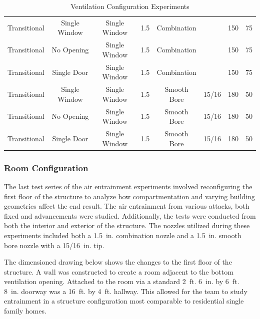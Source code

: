 \documentclass{article}
\begin{document}
\begin{table}[!ht]
{\begin{tabular}{|lccccccc|}
Transitional & Single Window & Single Window & 1.5 & Combination &  & 150 & 75 \\
Transitional & No Opening & Single Window & 1.5 & Combination &  & 150 & 75 \\
Transitional & Single Door & Single Window & 1.5 & Combination &  & 150 & 75 \\
Transitional & Single Window & Single Window & 1.5 & Smooth Bore & 15/16 & 180 & 50 \\
Transitional & No Opening & Single Window & 1.5 & Smooth Bore & 15/16 & 180 & 50 \\
Transitional & Single Door & Single Window & 1.5 & Smooth Bore & 15/16 & 180 & 50 \\ \hline
\end{tabular}}
\caption{Ventilation Configuration Experiments}
\label{Ventilation_Configuration_Experiments}
\end{table}

\clearpage

\subsubsection{Room Configuration}

The last test series of the air entrainment experiments involved reconfiguring the first floor of the structure to analyze how compartmentation and varying building geometries affect the end result. The air entrainment from various attacks, both fixed and advancements were studied. Additionally, the tests were conducted from both the interior and exterior of the structure. The nozzles utilized during these experiments included both a 1.5~in. combination nozzle and a 1.5~in. smooth bore nozzle with a 15/16~in. tip.

The dimensioned drawing below shows the changes to the first floor of the structure. A wall was constructed to create a room adjacent to the bottom ventilation opening. Attached to the room via a standard 2~ft. 6~in. by 6~ft. 8~in. doorway was a 16~ft. by 4~ft. hallway. This allowed for the team to study entrainment in a structure configuration most comparable to residential single family homes.
\end{document}
